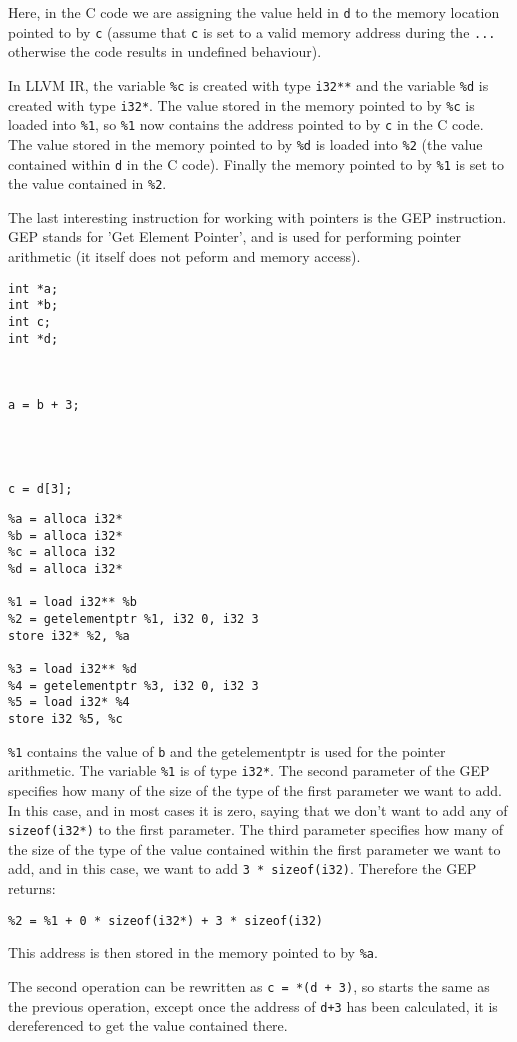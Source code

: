 Here, in the C code we are assigning the value held in \verb!d! to the memory location pointed to by \verb!c! (assume that \verb!c! is set to a valid memory address during the \verb!...! otherwise the code results in undefined behaviour).

In LLVM IR, the variable \verb!%c! is created with type \verb!i32**! and the variable \verb!%d! is created with type \verb!i32*!.
The value stored in the memory pointed to by \verb!%c! is loaded into \verb!%1!, so \verb!%1! now contains the address pointed to by \verb!c! in the C code.
The value stored in the memory pointed to by \verb!%d! is loaded into \verb!%2! (the value contained within \verb!d! in the C code).
Finally the memory pointed to by \verb!%1! is set to the value contained in \verb!%2!.

The last interesting instruction for working with pointers is the GEP instruction.
GEP stands for 'Get Element Pointer', and is used for performing pointer arithmetic (it itself does not peform and memory access).

\begin{minipage}[t]{0.3\linewidth}
\begin{verbatim}
int *a;
int *b;
int c;
int *d;



a = b + 3;




c = d[3];
\end{verbatim}
\end{minipage}
\begin{minipage}[t]{0.7\linewidth}
\begin{verbatim}
%a = alloca i32*
%b = alloca i32*
%c = alloca i32
%d = alloca i32*

%1 = load i32** %b
%2 = getelementptr %1, i32 0, i32 3
store i32* %2, %a

%3 = load i32** %d
%4 = getelementptr %3, i32 0, i32 3
%5 = load i32* %4
store i32 %5, %c
\end{verbatim}
\end{minipage}

\verb!%1! contains the value of \verb!b! and the getelementptr is used for the pointer arithmetic.
The variable \verb!%1! is of type \verb!i32*!.
The second parameter of the GEP specifies how many of the size of the type of the first parameter we want to add.
In this case, and in most cases it is zero, saying that we don't want to add any of \verb!sizeof(i32*)! to the first parameter.
The third parameter specifies how many of the size of the type of the value contained within the first parameter we want to add, and in this case, we want to add \verb!3 * sizeof(i32)!.
Therefore the GEP returns:

\begin{verbatim}
%2 = %1 + 0 * sizeof(i32*) + 3 * sizeof(i32)
\end{verbatim}

This address is then stored in the memory pointed to by \verb!%a!.

The second operation can be rewritten as \verb!c = *(d + 3)!, so starts the same as the previous operation, except once the address of \verb!d+3! has been calculated, it is dereferenced to get the value contained there.

